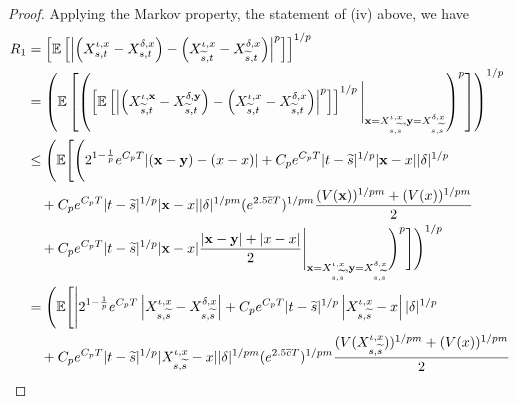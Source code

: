 \documentclass[11pt]{article}
\theoremstyle{theorem}
\theoremstyle{definition}
\newcommand{\1}{{\bf 1}}
\begin{document}
\begin{proof}
Applying the Markov property, the statement of (iv) above, we have
\begin{align*}
R_1&=\left[\mathbb{E}\left[\left|\left(X^{\iota, x}_{s,t}-X^{\delta,x}_{s,t}\right) - \left(X^{\iota, x}_{\widetilde{s},t}-X^{\delta, x}_{\widetilde{s},t}\right)\right|^p\right]\right]^{1/p} \notag\\ 
 & = \left(\mathbb{E}\left[\left(\left[\mathbb{E}\left[\left|\left(X^{\iota, \mathbf{x}}_{\widetilde{s},t}-X^{\delta,\mathbf{y}}_{\widetilde{s},t}\right) - \left(X^{\iota, x}_{\widetilde{s},t}-X^{\delta, x}_{\widetilde{s},t}\right)\right|^p\right]\right] ^{1/p}\Bigg| _{\mathbf{x}= X_{s, \widetilde{s}}^{\iota, x}, \mathbf{y}= X_{s, \widetilde{s}}^{\delta, x}} \right)^p\right]\right)^{1/p} \notag\\
 &\leq \Bigg(\mathbb{E}\Bigg[ \Bigg(  2^{1-\frac{1}{p}} e^{C_p T} |(\mathbf{x} - \mathbf{y}) - (x-x)|   + C_p e^{C_p T} |t-\widetilde{s}|^{1/p} |\mathbf{x}-x| |\delta |^{1/p} \notag\\
& \quad + C_p e^{C_p T} |t-\widetilde{s}|^{1/p} |\mathbf{x}-x||\delta|^{1/pm} (e^{2.5\overline{c}T})^{1/pm} \frac{   (V(\mathbf{x}))^{1/pm}+(V(x))^{1/pm}}{2} \notag \\
& \quad   + C_p e^{C_p T} |t-\widetilde{s}|^{1/p} |\mathbf{x}-x|  \dfrac{|\mathbf{x}-\mathbf{y}|+ |x-x|}{2}    \Bigg| _{\mathbf{x}= X_{s, \widetilde{s}}^{\iota, x}, 
\mathbf{y}= X_{s, \widetilde{s}}^{\delta, x}} \Bigg)^p\Bigg]\Bigg)^{1/p} \notag\\
& = \Bigg(\mathbb{E}\Bigg[\Bigg|    2^{1-\frac{1}{p}} e^{C_p T} \left|X_{s, \widetilde{s}}^{\iota, x} - X_{s, \widetilde{s}}^{\delta, x}\right|  + C_p e^{C_p T} |t-\widetilde{s}|^{1/p} \left|X_{s, \widetilde{s}}^{\iota, x}-x \right| |\delta |^{1/p} \notag\\ 
 & \quad + C_p e^{C_p T} |t-\widetilde{s}|^{1/p} |X_{s, \widetilde{s}}^{\iota, x}-x||\delta|^{1/pm} (e^{2.5\overline{c}T})^{1/pm} \frac{   (V(X_{s, \widetilde{s}}^{\iota, x}))^{1/pm}+(V(x))^{1/pm}}{2} \notag \\

\end{align*}
\end{proof}
\end{document}
